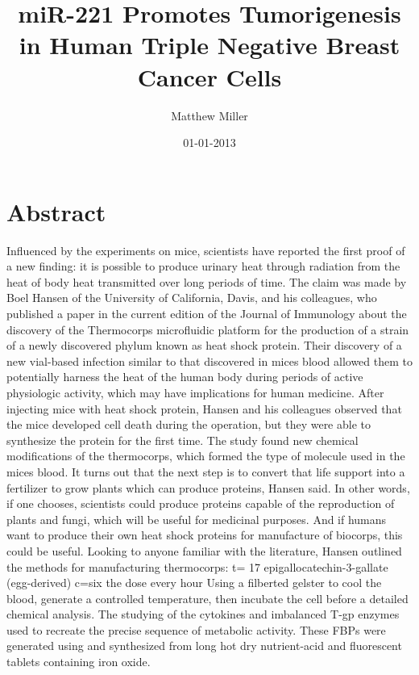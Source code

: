 \documentclass{article}%
\title{miR{-}221 Promotes Tumorigenesis in Human Triple Negative Breast Cancer Cells}%
\author{Matthew Miller}%
\affil{Department of Laboratory Medicine, The First Affiliated Hospital of Sun Yat{-}sen University, Guangzhou, Guangdong, China}%
\date{01{-}01{-}2013}%
\begin{document}
%
\normalsize%
\maketitle%
\section{Abstract}%
\label{sec:Abstract}%
Influenced by the experiments on mice, scientists have reported the first proof of a new finding: it is possible to produce urinary heat through radiation from the heat of body heat transmitted over long periods of time.\newline%
The claim was made by Boel Hansen of the University of California, Davis, and his colleagues, who published a paper in the current edition of the Journal of Immunology about the discovery of the Thermocorps microfluidic platform for the production of a strain of a newly discovered phylum known as heat shock protein.\newline%
Their discovery of a new vial{-}based infection similar to that discovered in mices blood allowed them to potentially harness the heat of the human body during periods of active physiologic activity, which may have implications for human medicine.\newline%
After injecting mice with heat shock protein, Hansen and his colleagues observed that the mice developed cell death during the operation, but they were able to synthesize the protein for the first time.\newline%
The study found new chemical modifications of the thermocorps, which formed the type of molecule used in the mices blood. It turns out that the next step is to convert that life support into a fertilizer to grow plants which can produce proteins, Hansen said.\newline%
In other words, if one chooses, scientists could produce proteins capable of the reproduction of plants and fungi, which will be useful for medicinal purposes. And if humans want to produce their own heat shock proteins for manufacture of biocorps, this could be useful.\newline%
Looking to anyone familiar with the literature, Hansen outlined the methods for manufacturing thermocorps:\newline%
t= 17 epigallocatechin{-}3{-}gallate (egg{-}derived)\newline%
c=six the dose every hour\newline%
 Using a filberted gelster to cool the blood, generate a controlled temperature, then incubate the cell before a detailed chemical analysis. The studying of the cytokines and imbalanced T{-}gp enzymes used to recreate the precise sequence of metabolic activity. These FBPs were generated using and synthesized from long hot dry nutrient{-}acid and fluorescent tablets containing iron oxide.\newline%
\end{document}
